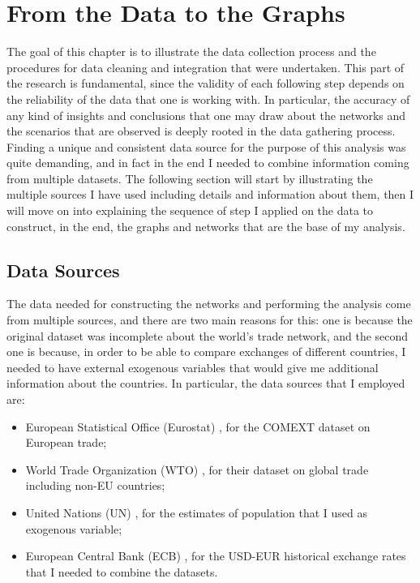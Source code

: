 
\chapter{From the Data to the Graphs}\label{ch:2data}
The goal of this chapter is to illustrate the data collection process and the procedures for data cleaning and integration that were undertaken. This part of the research is fundamental, since the validity of each following step depends on the reliability of the data that one is working with. In particular, the accuracy of any kind of insights and conclusions that one may draw about the networks and the scenarios that are observed is deeply rooted in the data gathering process.
Finding a unique and consistent data source for the purpose of this analysis was quite demanding, and in fact in the end I needed to combine information coming from multiple datasets. The following section will start by illustrating the multiple sources I have used including details and information about them, then I will move on into explaining the sequence of step I applied on the data to construct, in the end, the graphs and networks that are the base of my analysis.

\section{Data Sources}

The data needed for constructing the networks and performing the analysis come from multiple sources, and there are two main reasons for this: one is because the original dataset was incomplete about the world's trade network, and the second one is because, in order to be able to compare exchanges of different countries, I needed to have external exogenous variables that would give me additional information about the countries. In particular, the data sources that I employed are:
\begin{itemize}
    \item European Statistical Office (Eurostat) \cite{eurostat2022comext}, for the COMEXT dataset on European trade;
    \item World Trade Organization (WTO) \cite{wto2022stats}, for their dataset on global trade including non-EU countries;
    \item United Nations (UN) \cite{un2022population}, for the estimates of population that I used as exogenous variable;
    \item European Central Bank (ECB) \cite{ecb2021usdeur}, for the USD-EUR historical exchange rates that I needed to combine the datasets.
\end{itemize}


